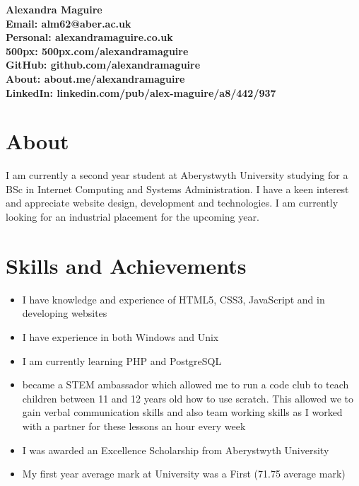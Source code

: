 \documentclass[a4paper,10pt]{article}
\begin{document}
\begin{center}
\bf{\Huge{Alexandra Maguire}} \\[0.5cm]
\large Email: alm62@aber.ac.uk \\
\large Personal: alexandramaguire.co.uk \\
\large 500px: 500px.com/alexandramaguire\\
\large GitHub: github.com/alexandramaguire \\
\large About: about.me/alexandramaguire\\
\large LinkedIn: linkedin.com/pub/alex-maguire/a8/442/937\\[0.5cm]
\end{center}
\vspace{20pt}
\section*{About}
I am currently a second year student at Aberystwyth University studying for a BSc in Internet Computing and Systems Administration. I have a keen interest and appreciate website design, development and technologies. I am currently looking for an industrial placement for the upcoming year.
\section*{Skills and Achievements}
\begin{itemize}
    \item I have knowledge and experience of HTML5, CSS3, JavaScript and in developing websites
    \item I have experience in both Windows and Unix
    \item I am currently learning PHP and PostgreSQL
    \item  became a STEM ambassador which allowed me to run a code club to teach children between 11 and 12 years old how to use scratch. This allowed we to gain verbal communication skills and also team working skills as I worked with a partner for these lessons an hour every week
     \item I was awarded an Excellence Scholarship from Aberystwyth University 
     \item My first year average mark at University was a First (71.75 average mark)
\end{itemize}
\end{document}
